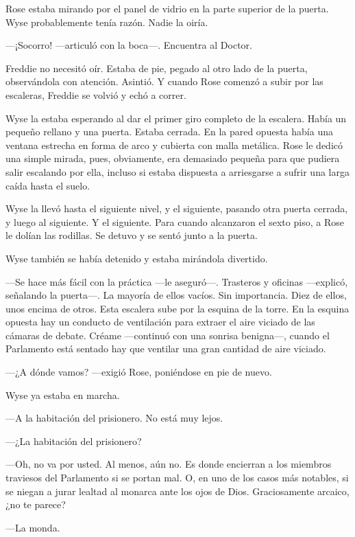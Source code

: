 {Rose estaba mirando por el panel de vidrio en la parte superior de la
puerta. Wyse probablemente tenía razón. Nadie la oiría.}

{---¡Socorro! ---articuló con la boca---. Encuentra al Doctor.}

{Freddie no necesitó oír. Estaba de pie, pegado al otro lado de la
	puerta, observándola con atención. Asintió. Y cuando Rose comenzó a
subir por las escaleras, Freddie se volvió y echó a correr.}

{Wyse la estaba esperando al dar el primer giro completo de la escalera.
	Había un pequeño rellano y una puerta. Estaba cerrada. En la pared
	opuesta había una ventana estrecha en forma de arco y cubierta con malla
	metálica. Rose le dedicó una simple mirada, pues, obviamente, era
	demasiado pequeña para que pudiera salir escalando por ella, incluso si
estaba dispuesta a arriesgarse a sufrir una larga caída hasta el suelo.}

{Wyse la llevó hasta el siguiente nivel, y el siguiente, pasando otra
	puerta cerrada, y luego al siguiente. Y el siguiente. Para cuando
	alcanzaron el sexto piso, a Rose le dolían las rodillas. Se detuvo y se
sentó junto a la puerta.}

\mbox{}

{Wyse también se había detenido y estaba mirándola divertido.}

{---Se hace más fácil con la práctica ---le aseguró---. Trasteros y
	oficinas ---explicó, señalando la puerta---. La mayoría de ellos vacíos.
	Sin importancia. Diez de ellos, unos encima de otros. Esta escalera sube
	por la esquina de la torre. En la esquina opuesta hay un conducto de
	ventilación para extraer el aire viciado de las cámaras de debate.
	Créame ---continuó con una sonrisa benigna---, cuando el Parlamento está
sentado hay que ventilar una gran cantidad de aire viciado.}

{---¿A dónde vamos? ---exigió Rose, poniéndose en pie de nuevo.}

{Wyse ya estaba en marcha.}

{---A la habitación del prisionero. No está muy lejos.}

{---¿La habitación del prisionero?}

{---Oh, no va por usted. Al menos, aún no. Es donde encierran a los
	miembros traviesos del Parlamento si se portan mal. O, en uno de los
	casos más notables, si se niegan a jurar lealtad al monarca ante los
ojos de Dios. Graciosamente arcaico, ¿no te parece?}

{---La monda.}

